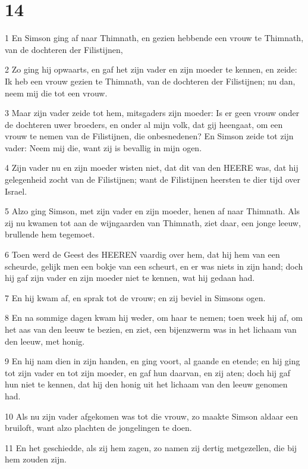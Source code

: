 \chapter{14}

\par 1 En Simson ging af naar Thimnath, en gezien hebbende een vrouw te Thimnath, van de dochteren der Filistijnen,
\par 2 Zo ging hij opwaarts, en gaf het zijn vader en zijn moeder te kennen, en zeide: Ik heb een vrouw gezien te Thimnath, van de dochteren der Filistijnen; nu dan, neem mij die tot een vrouw.
\par 3 Maar zijn vader zeide tot hem, mitsgaders zijn moeder: Is er geen vrouw onder de dochteren uwer broeders, en onder al mijn volk, dat gij heengaat, om een vrouw te nemen van de Filistijnen, die onbesnedenen? En Simson zeide tot zijn vader: Neem mij die, want zij is bevallig in mijn ogen.
\par 4 Zijn vader nu en zijn moeder wisten niet, dat dit van den HEERE was, dat hij gelegenheid zocht van de Filistijnen; want de Filistijnen heersten te dier tijd over Israel.
\par 5 Alzo ging Simson, met zijn vader en zijn moeder, henen af naar Thimnath. Als zij nu kwamen tot aan de wijngaarden van Thimnath, ziet daar, een jonge leeuw, brullende hem tegemoet.
\par 6 Toen werd de Geest des HEEREN vaardig over hem, dat hij hem van een scheurde, gelijk men een bokje van een scheurt, en er was niets in zijn hand; doch hij gaf zijn vader en zijn moeder niet te kennen, wat hij gedaan had.
\par 7 En hij kwam af, en sprak tot de vrouw; en zij beviel in Simsons ogen.
\par 8 En na sommige dagen kwam hij weder, om haar te nemen; toen week hij af, om het aas van den leeuw te bezien, en ziet, een bijenzwerm was in het lichaam van den leeuw, met honig.
\par 9 En hij nam dien in zijn handen, en ging voort, al gaande en etende; en hij ging tot zijn vader en tot zijn moeder, en gaf hun daarvan, en zij aten; doch hij gaf hun niet te kennen, dat hij den honig uit het lichaam van den leeuw genomen had.
\par 10 Als nu zijn vader afgekomen was tot die vrouw, zo maakte Simson aldaar een bruiloft, want alzo plachten de jongelingen te doen.
\par 11 En het geschiedde, als zij hem zagen, zo namen zij dertig metgezellen, die bij hem zouden zijn.
